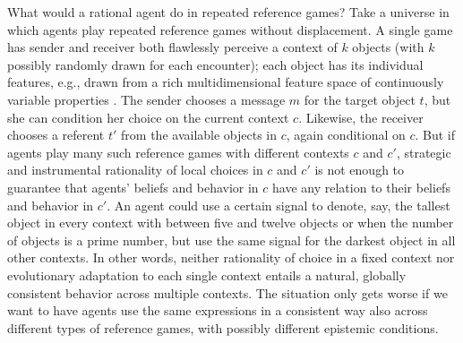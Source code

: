 \documentclass[a4paper]{article}
\begin{document}
What would a rational agent do in repeated reference games? 
Take a universe in which agents play repeated reference games without displacement. 
A single game has sender and receiver both flawlessly perceive a context of $k$ objects (with $k$ possibly randomly drawn for each encounter); each object has its individual features, e.g., drawn from a rich multidimensional feature space of continuously variable properties \parencite[\emph{e.g.}][]{Franke2012:Scales-Salience,Franke2012:On-Scales-Salie}. 
The sender chooses a message $m$ for the target object $t$, but she can condition her choice on the current context $c$. 
Likewise, the receiver chooses a referent $t'$ from the available objects in $c$, again conditional on $c$. 
But if agents play many such reference games with different contexts $c$ and $c'$, strategic and instrumental rationality of local choices in $c$ and $c'$ is not enough to guarantee that agents' beliefs and behavior in $c$ have any relation to their beliefs and behavior in $c'$. 
An agent could use a certain signal to denote, say, the tallest object in every context with between five and twelve objects or when the number of objects is a prime number, but use the same signal for the darkest object in all other contexts.
In other words, neither rationality of choice in a fixed context nor evolutionary adaptation to each single context entails a natural, globally consistent behavior across multiple contexts. 
The situation only gets worse if we want to have agents use the same expressions in a consistent way also across different types of reference games, with possibly different epistemic conditions. 
\end{document}
